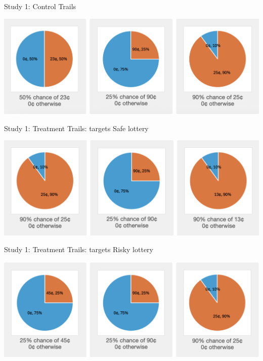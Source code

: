 \documentclass[
  ignorenonframetext,
  aspectratio=169]{beamer}
\begin{document}
\begin{frame}{Study 1: Control Trails}
\label{study-1-control-trails}
\begin{center}
  \includegraphics[width=1\textwidth]{Control.png}
\end{center}
\end{frame}

\begin{frame}{Study 1: Treatment Trails: targets Safe lottery}
\label{study-1-treatment-trails-targets-safe-lottery}
\begin{center}
  \includegraphics[width=1\textwidth]{Treatment_Risk_Averse.png}
\end{center}
\end{frame}

\begin{frame}{Study 1: Treatment Trails: targets Risky lottery}
\label{study-1-treatment-trails-targets-risky-lottery}
\begin{center}
  \includegraphics[width=1\textwidth]{Treatment_Risk_Seeking.png}
\end{center}
\end{frame}
\end{document}
